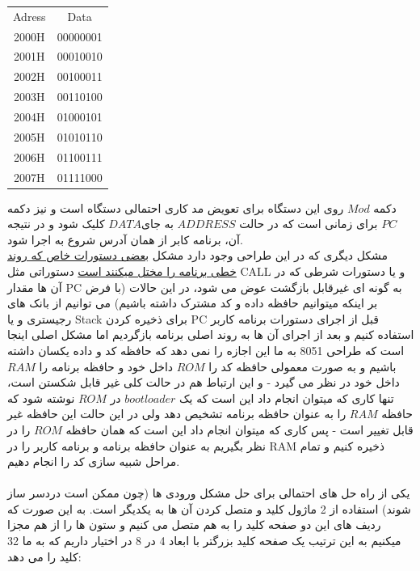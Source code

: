 \documentclass[a4paper,12pt]{article}
\begin{document}
\begin{center}
\begin{tabular}{|c|c|}
  \hline
  Adress & Data \\
  2000H & 00000001 \\
  2001H & 00010010 \\ 
  2002H & 00100011 \\
  2003H & 00110100 \\
  2004H & 01000101 \\ 
  2005H & 01010110 \\
  2006H & 01100111 \\
  2007H & 01111000 \\
  \hline
\end{tabular}
\end{center}
دکمه $Mod$ روی این دستگاه برای تعویض مد کاری احتمالی دستگاه است و نیز دکمه $PC$ برای زمانی است که در حالت $ADDRESS$ به جای$DATA$ کلیک شود و در نتیجه آن، برنامه کابر از همان آدرس شروع به اجرا شود.
\\
مشکل دیگری که در این طراحی وجود دارد مشکل \underline{بعضی دستورات خاص که روند خطی برنامه را مختل میکنند است} دستوراتی مثل CALL و یا دستورات شرطی که در آن ها مقدار PC به گونه ای غیرقابل بازگشت عوض می شود، در این حالات (با فرض بر اینکه میتوانیم حافظه داده و کد مشترک داشته باشیم) می توانیم از بانک های رجیستری و یا Stack برای ذخیره کردن PC قبل از اجرای دستورات برنامه کاربر استفاده کنیم و بعد از اجرای آن ها به روند اصلی برنامه بازگردیم اما مشکل اصلی اینجا است که طراحی 8051 به ما این اجازه را نمی دهد که حافظه کد و داده یکسان داشته باشیم و به صورت معمولی حافظه کد را $ROM$ داخل خود و حافظه برنامه را $RAM$ داخل خود در نظر می گیرد - و این ارتباط هم در حالت کلی غیر قابل شکستن است، تنها کاری که میتوان انجام داد این است که یک $boot loader$ در $ROM$ نوشته شود که حافظه $RAM$ را به عنوان حافظه برنامه تشخیص دهد ولی در این حالت این حافظه غیر قابل تغییر است - پس کاری که میتوان انجام داد این است که همان حافظه $ROM$ را در نظر بگیریم به عنوان حافظه برنامه و برنامه کاربر را در RAM ذخیره کنیم و تمام مراحل شبیه سازی کد را انجام دهیم.
\\
\\
یکی از راه حل های احتمالی برای حل مشکل ورودی ها (چون ممکن است دردسر ساز شوند) استفاده از 2 ماژول کلید و متصل کردن آن ها به یکدیگر است. به این صورت که ردیف های این دو صفحه کلید را به هم متصل می کنیم و ستون ها را از هم مجزا میکنیم به این ترتیب یک صفحه کلید بزرگتر با ابعاد 4 در 8 در اختیار داریم که به ما 32 کلید را می دهد:
\end{document}
